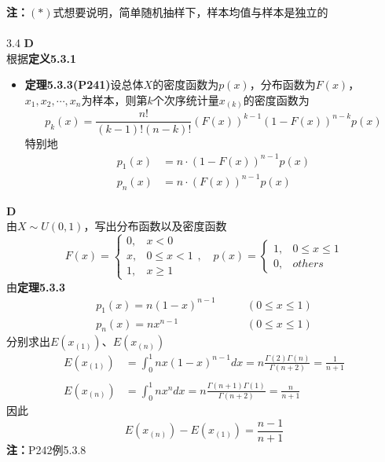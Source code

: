 \documentclass[a4paper]{ctexart}    %
\begin{document}
	\textbf{注：}$(*)$式想要说明，简单随机抽样下，样本均值与样本是独立的 \\
	\\
	3.4 \quad \textbf{D}\\
	根据\textbf{定义5.3.1}\\
	\begin{tcolorbox}
		[
		colframe=blue!25,
		colback=blue!10,
		coltitle=blue!20!black,  
		fonttitle=\bfseries,
		adjusted title=Formula Or Theorem:
		]
		\begin{itemize}
			\item \textbf{定理5.3.3(P241)}设总体$ X $的密度函数为$ p(x) $，分布函数为$ F(x) $，$ x_1, x_2, \cdots, x_n $为样本，则第$ k $个次序统计量$ x_{(k)} $的密度函数为
			\begin{equation*}
				p_k(x) = \frac{n!}{(k-1)!(n-k)!}(F(x))^{k-1}(1-F(x))^{n-k}p(x)
			\end{equation*}
			特别地
			\begin{equation*}
				\begin{split}
					p_1(x) &= n\cdot (1-F(x))^{n-1}p(x) \\
					p_n(x) &= n\cdot (F(x))^{n-1}p(x)
				\end{split}
			\end{equation*}
		\end{itemize}
	\end{tcolorbox}
	 \quad \textbf{D} \\
	由$ X \sim U(0, 1) $，写出分布函数以及密度函数
	\begin{equation*}
		F(x) = 
		\begin{cases}
			0, & x < 0 \\
			x, & 0 \leq x < 1 \\
			1, & x \geq 1
		\end{cases} , \quad 
		p(x) = 
		\begin{cases}
			1, & 0 \leq x \leq 1 \\
			0, & others
		\end{cases}
	\end{equation*}
	由\textbf{定理5.3.3}
	\begin{equation*}
		\begin{split}
			p_1(x) = n(1-x)^{n-1} & \qquad (0 \leq x \leq 1) \\
			p_n(x) = nx^{n-1} & \qquad (0 \leq x \leq 1)
		\end{split}
	\end{equation*}
	分别求出$ E(x_{(1)}) $、$ E(x_{(n)}) $
	\begin{equation*}
		\begin{split}
			E(x_{(1)}) &= \int_{0}^{1} nx(1-x)^{n-1}dx = n\frac{\Gamma(2)\Gamma(n)}{\Gamma(n+2)} = \frac{1}{n+1} \\
			\\
			E(x_{(n)}) &= \int_{0}^{1} nx^ndx = n\frac{\Gamma(n+1)\Gamma(1)}{\Gamma(n+2)} = \frac{n}{n+1}
		\end{split}
	\end{equation*}
	因此
	\begin{equation*}
		E(x_{(n)}) - E(x_{(1)}) = \frac{n-1}{n+1}
	\end{equation*}
	\textbf{注：}P242\quad 例5.3.8 \\
\end{document}
